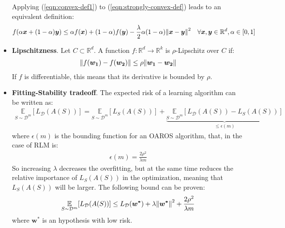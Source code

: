 \documentclass[../template.tex]{subfiles}
\begin{document}
\begin{itemize}
    Applying (\ref{eqn:convex-def1}) to (\ref{eqn:strongly-convex-def}) leads to an equivalent definition:
    \begin{align}
        f(\alpha\bm{x} + (1-\alpha)\bm{y}) \leq \alpha f(\bm{x}) + (1-\alpha)f(\bm{y}) - \frac{\lambda}{2} \alpha (1-\alpha) \norm{\bm{x} - \bm{y}}^2 \quad \forall \bm{x}, \bm{y} \in \mathbb{R}^d, \alpha \in [0,1] \label{eqn:strongly-convex-def2}
    \end{align} 
    \item \textbf{Lipschitzness}. Let $C \subset \mathbb{R}^d$. A function $f\colon \mathbb{R}^d \to \mathbb{R}^k$ is $\rho$-Lipschitz over $C$  if:
    \begin{align*}
        \norm{f(\bm{w_1}) - f(\bm{w_2})} \leq \rho \norm{\bm{w_1} - \bm{w_2}} 
    \end{align*}
    If $f$ is differentiable, this means that its derivative is bounded by $\rho$. 
    \item \textbf{Fitting-Stability tradeoff}.  The expected risk of a learning algorithm can be written as:
    \begin{align*}
        \underset{S \sim \mathcal{D}^m}{\mathbb{E}} [L_{\mathcal{D}}(A(S))] = \underset{S \sim \mathcal{D}^m}{\mathbb{E}} [L_S(A(S))] + \underbrace{\underset{S \sim \mathcal{D}^m}{\mathbb{E}}[L_{\mathcal{D}}(A(S)) - L_S(A(S))]}_{\leq \epsilon(m)}
    \end{align*}
    where $\epsilon(m)$ is the bounding function for an OAROS algorithm, that, in the case of RLM is:
    \begin{align*}
        \epsilon(m) =  \frac{2 \rho^2}{\lambda m}
    \end{align*}
    So increasing $\lambda$ decreases the overfitting, but at the same time reduces the relative importance of $L_S(A(S))$ in the optimization, meaning that $L_S(A(S))$ will be larger. The following bound can be proven:
    \begin{align*}
        \underset{S \sim \mathcal{D}^m}{\mathbb{E}} [L_{\mathcal{D}}(A(S))] \leq L_{\mathcal{D}}(\bm{w^*}) + \lambda \norm{\bm{w^*}}^2 + \frac{2 \rho^2}{\lambda m}
    \end{align*}
    where $\bm{w^*}$ is an hypothesis with low risk. 
\end{itemize}
\end{document}
